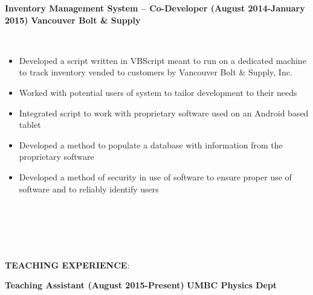 \documentclass{article}
\begin{document}
\begin{vwcol}[widths={0.8,0.2}, sep=.8cm, justify=flush, rule=0pt, indent=0em]
\noindent \textbf{Inventory Management System – Co-Developer (August 2014-January 2015)}
\newpage
\noindent \textbf{Vancouver Bolt \& Supply}
\end{vwcol}
\phantom \\
\begin{itemize}
\item Developed a script written in VBScript meant to run on a dedicated machine to track inventory vended to customers by Vancouver Bolt \& Supply, Inc.
\item Worked with potential users of system to tailor development to their needs
\item Integrated script to work with proprietary software used on an Android based tablet
\item Developed a method to populate a database with information from the proprietary software
\item Developed a method of security in use of software to ensure proper use of software and to reliably identify users
\end{itemize}
\phantom \\
\phantom \\
%
%
%
%
\par
\phantom \\
\phantom \\
\noindent \textbf{TEACHING EXPERIENCE}:\\
\begin{vwcol}[widths={0.8,0.2}, sep=.8cm, justify=flush, rule=0pt, indent=0em]
\noindent \textbf{Teaching Assistant (August 2015-Present)}
\newpage
\noindent \textbf{UMBC Physics Dept}
\end{vwcol}
\phantom \\
\end{document}
